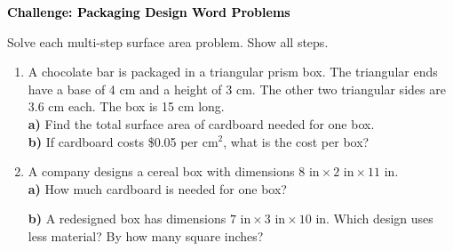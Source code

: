 \documentclass[12pt, letterpaper, fleqn]{article}
\begin{document}
\newpage

\begin{tcolorbox}[colback=black!10]
\large\textcolor{black}{\textbf{Challenge: Packaging Design Word Problems}}
\end{tcolorbox}

\noindent
Solve each multi-step surface area problem. Show all steps.

\vspace{3mm}

\begin{enumerate}[itemsep=2cm, leftmargin=0.6cm]

\item A chocolate bar is packaged in a triangular prism box. The triangular ends have a base of 4 cm and a height of 3 cm. The other two triangular sides are 3.6 cm each. The box is 15 cm long.\\
\textbf{a)} Find the total surface area of cardboard needed for one box.  \\

\vspace{1cm}
\textbf{b)} If cardboard costs \$0.05 per cm$^2$, what is the cost per box? 

\vspace{1cm}

\item A company designs a cereal box with dimensions $8\text{ in} \times 2\text{ in} \times 11\text{ in}$.\\
\textbf{a)} How much cardboard is needed for one box? 
\vspace{4cm}

\textbf{b)} A redesigned box has dimensions $7\text{ in} \times 3\text{ in} \times 10\text{ in}$. Which design uses less material? By how many square inches? 
\vspace{1cm}


\vspace{1.5cm}

\end{enumerate}
\end{document}
